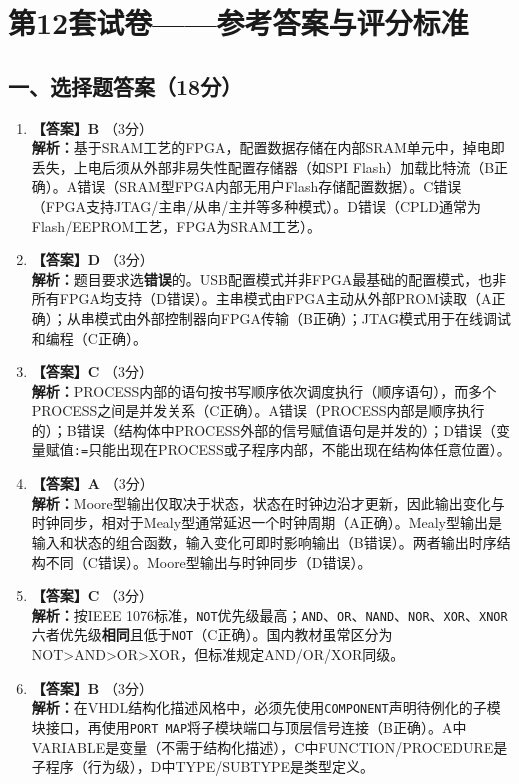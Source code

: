 \chapter{第12套试卷——参考答案与评分标准}

\section{一、选择题答案（18分）}

\begin{enumerate}[label=\arabic*.]

\item \textbf{【答案】B} \quad（3分）\\
\textbf{解析：}基于SRAM工艺的FPGA，配置数据存储在内部SRAM单元中，掉电即丢失，上电后须从外部非易失性配置存储器（如SPI Flash）加载比特流（B正确）。A错误（SRAM型FPGA内部无用户Flash存储配置数据）。C错误（FPGA支持JTAG/主串/从串/主并等多种模式）。D错误（CPLD通常为Flash/EEPROM工艺，FPGA为SRAM工艺）。

\item \textbf{【答案】D} \quad（3分）\\
\textbf{解析：}题目要求选\textbf{错误}的。USB配置模式并非FPGA最基础的配置模式，也非所有FPGA均支持（D错误）。主串模式由FPGA主动从外部PROM读取（A正确）；从串模式由外部控制器向FPGA传输（B正确）；JTAG模式用于在线调试和编程（C正确）。

\item \textbf{【答案】C} \quad（3分）\\
\textbf{解析：}PROCESS内部的语句按书写顺序依次调度执行（顺序语句），而多个PROCESS之间是并发关系（C正确）。A错误（PROCESS内部是顺序执行的）；B错误（结构体中PROCESS外部的信号赋值语句是并发的）；D错误（变量赋值\texttt{:=}只能出现在PROCESS或子程序内部，不能出现在结构体任意位置）。

\item \textbf{【答案】A} \quad（3分）\\
\textbf{解析：}Moore型输出仅取决于状态，状态在时钟边沿才更新，因此输出变化与时钟同步，相对于Mealy型通常延迟一个时钟周期（A正确）。Mealy型输出是输入和状态的组合函数，输入变化可即时影响输出（B错误）。两者输出时序结构不同（C错误）。Moore型输出与时钟同步（D错误）。

\item \textbf{【答案】C} \quad（3分）\\
\textbf{解析：}按IEEE 1076标准，\texttt{NOT}优先级最高；\texttt{AND}、\texttt{OR}、\texttt{NAND}、\texttt{NOR}、\texttt{XOR}、\texttt{XNOR}六者优先级\textbf{相同}且低于\texttt{NOT}（C正确）。国内教材虽常区分为NOT>AND>OR>XOR，但标准规定AND/OR/XOR同级。

\item \textbf{【答案】B} \quad（3分）\\
\textbf{解析：}在VHDL结构化描述风格中，必须先使用\texttt{COMPONENT}声明待例化的子模块接口，再使用\texttt{PORT MAP}将子模块端口与顶层信号连接（B正确）。A中VARIABLE是变量（不需于结构化描述），C中FUNCTION/PROCEDURE是子程序（行为级），D中TYPE/SUBTYPE是类型定义。

\end{enumerate}

